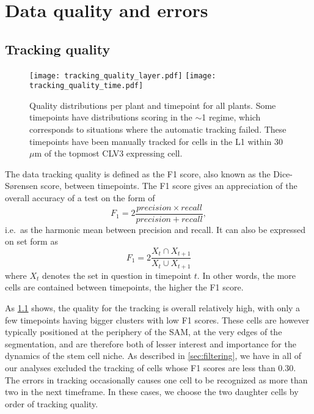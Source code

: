 

\ifpdf
\graphicspath{{Appendix1/Figs/Raster/}{Appendix1/Figs/PDF/}{Appendix1/Figs/}}
\else
\graphicspath{{Appendix1/Figs/Vector/}{Appendix1/Figs/}}
\fi

\chapter{Data quality and errors} 
\section{Tracking quality}
\label{sec:data_errors}
\begin{figure}[p]
    \centering
        \centering
        \texttt{[image: tracking\_quality\_layer.pdf]}
        \centering
        \texttt{[image: tracking\_quality\_time.pdf]} %
        \caption[Tracking quality]{Quality distributions per plant and timepoint for all plants.
        Some timepoints have distributions scoring in the $\sim$1 regime, which
        corresponds to situations where the automatic tracking failed. These
        timepoints have been manually tracked for cells in the L1 within 30
        $\mu$m of the topmost CLV3 expressing cell.}
      \label{fig:tracking_quality}
\end{figure}
The data tracking quality is defined as the F1 score, also known as the
Dice-S{\o}rensen score, between timepoints. The
F1 score gives an appreciation of the overall accuracy of a test on the form of
\begin{equation}
  F_1 = 2 \frac{precision\times recall}{precision + recall},
  \label{eq:f1}
\end{equation}
i.e.\ as the harmonic mean between precision and recall. It can also be
expressed on set form as 
\begin{equation}
  F_1 = 2 \frac{X_t \cap X_{t+1}}{X_t \cup X_{t+1}}
  \label{eq:f1_set}
\end{equation}
where $X_t$ denotes the set in question in timepoint $t$. In other words, the more cells are
contained between timepoints, the higher the F1 score.

As \cref{fig:tracking_quality} shows, the quality for the tracking is overall
relatively high, with only a few timepoints having bigger clusters with low F1
scores. These cells are however typically positioned at the periphery of the
SAM, at the very edges of the segmentation, and are therefore both of lesser
interest and importance for the dynamics of the stem cell niche. As described in
\cref{sec:filtering}, we have in all of our analyses excluded the tracking of
cells whose F1 scores are less than $0.30$. The errors in tracking occasionally
causes one cell to be recognized as more than two in the next timeframe. In
these cases, we choose the two daughter cells by order of tracking quality.

